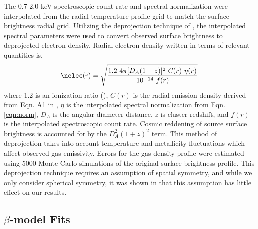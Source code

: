 \documentclass{emulateapj}
\begin{document}
The 0.7-2.0 keV spectroscopic count rate and spectral normalization
were interpolated from the radial temperature profile grid to match
the surface brightness radial grid. Utilizing the deprojection
technique of \cite{kriss83}, the interpolated spectral parameters were
used to convert observed surface brightness to deprojected electron
density. Radial electron density written in terms of relevant
quantities is,
\begin{equation}
\nelec(r) = \sqrt{\frac{1.2~4 \pi [D_A(1+z)]^2~C(r)~\eta(r)}{10^{-14}~f(r)}}
\end{equation}
where 1.2 is an ionization ratio (\np), $C(r)$ is the radial
emission density derived from Eqn. A1 in \cite{kriss83}, $\eta$ is the
interpolated spectral normalization from Eqn. \ref{eqn:norm}, $D_A$ is
the angular diameter distance, $z$ is cluster redshift, and $f(r)$ is
the interpolated spectroscopic count rate. Cosmic reddening of source
surface brightness is accounted for by the $D_A^2 (1+z)^2$ term. This
method of deprojection takes into account temperature and metallicity
fluctuations which affect observed gas emissivity. Errors for the gas
density profile were estimated using 5000 Monte Carlo simulations of
the original surface brightness profile. This deprojection technique
requires an assumption of spatial symmetry, and while we only consider
spherical symmetry, it was shown in \cite{d06} that this assumption
has little effect on our results.

\subsection{$\beta$-model Fits}
\label{sec:beta}
\end{document}
